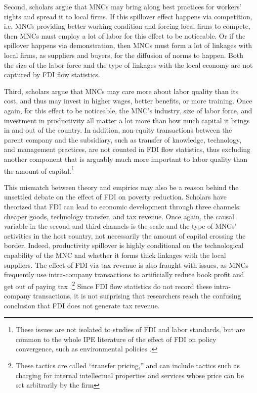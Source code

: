 Second, scholars argue that MNCs may bring along best practices for workers'
rights and spread it to local firms. If this spillover effect happens via
competition, i.e. MNCs providing better working condition and forcing local
firms to compete, then MNCs must employ a lot of labor for this effect to be
noticeable. Or if the spillover happens via demonstration, then MNCs must form a
lot of linkages with local firms, as suppliers and buyers, for the diffusion of
norms to happen. Both the size of the labor force and the type of linkages with
the local economy are not captured by FDI flow statistics.

Third, scholars argue that MNCs may care more about labor quality than its cost,
and thus may invest in higher wages, better benefits, or more training. Once
again, for this effect to be noticeable, the MNC's industry, size of labor
force, and investment in productivity all matter a lot more than how much
capital it brings in and out of the country. In addition, non-equity
transactions between the parent company and the subsidiary, such as transfer of
knowledge, technology, and management practices, are not counted in FDI flow
statistics, thus excluding another component that is arguably much more
important to labor quality than the amount of capital.\footnote{These issues are
  not isolated to studies of FDI and labor standards, but are common to the
  whole IPE literature of the effect of FDI on policy convergence, such as
  environmental policies \citep{Prakash2007}.}

This mismatch between theory and empirics may also be a reason behind the
unsettled debate on the effect of FDI on poverty reduction. Scholars have
theorized that FDI can lead to economic development through three channels:
cheaper goods, technology transfer, and tax revenue. Once again, the causal
variable in the second and third channels is the scale and the type of MNCs'
activities in the host country, not necessarily the amount of capital crossing
the border. Indeed, productivity spillover is highly conditional on the
technological capability of the MNC and whether it forms thick linkages with the
local suppliers. The effect of FDI via tax revenue is also fraught with issues,
as MNCs frequently use intra-company transactions to artificially reduce book
profit and get out of paying tax \citep{Malesky2015c}.\footnote{These tactics
  are called ``transfer pricing,'' and can include tactics such as charging for
  internal intellectual properties and services whose price can be set
  arbitrarily by the firm} Since FDI flow statistics do not record these
intra-company transactions, it is not surprising that researchers reach the
confusing conclusion that FDI does not generate tax revenue.

